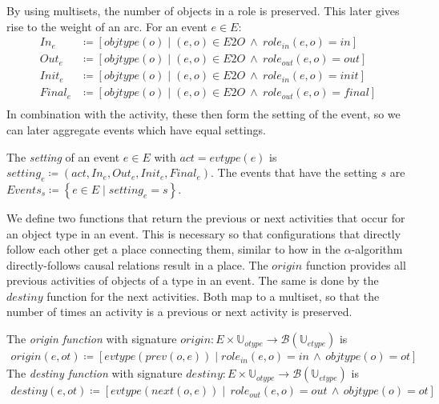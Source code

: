 By using multisets, the number of objects in a role is preserved.
This later gives rise to the weight of an arc.
For an event $e \in E$:
\begin{align*}
    \mathit{In}_e &\coloneqq \left[ objtype(o) \mid (e, o) \in E2O\ \land\ role_{in}(e, o) = in \right] \\
    \mathit{Out}_e &\coloneqq \left[ objtype(o) \mid (e, o) \in E2O\ \land\ role_{out}(e, o) = out \right] \\
    \mathit{Init}_e &\coloneqq \left[ objtype(o) \mid (e, o) \in E2O\ \land\ role_{in}(e, o) = init \right] \\
    \mathit{Final}_e &\coloneqq \left[ objtype(o) \mid (e, o) \in E2O\ \land\ role_{out}(e, o) = final \right] \\
\end{align*}
In combination with the activity, these then form the setting of the event, so we can later aggregate events which have equal settings.
\begin{definition}[Setting]
    The \emph{setting} of an event $e \in E$ with $act = evtype(e)$ is $setting_e \coloneqq (act, \mathit{In}_e, \mathit{Out}_e, \mathit{Init}_e, \mathit{Final}_e)$.
    The events that have the setting $s$ are $\mathit{Events}_s \coloneqq \left\{ e \in E \mid setting_e = s \right\}$.
\end{definition}




We define two functions that return the previous or next activities that occur for an object type in an event.
This is necessary so that configurations that directly follow each other get a place connecting them, similar to how in the $\alpha$-algorithm directly-follows causal relations result in a place\autocite{van2004}.
The $origin$ function provides all previous activities of objects of a type in an event.
The same is done by the $destiny$ function for the next activities.
Both map to a multiset, so that the number of times an activity is a previous or next activity is preserved.
\begin{definition}
    The \emph{origin function} with signature $origin: E \times \mathbb{U}_{otype} \rightarrow \mathcal{B}(\mathbb{U}_{etype})$ is 
    \begin{align*}
        origin(e, ot) \coloneqq [ evtype(prev(o, e)) \mid role_{in}(e, o) = in\,  \land\, objtype(o) = ot ]
    \end{align*}
    The \emph{destiny function} with signature $destiny: E \times \mathbb{U}_{otype} \rightarrow \mathcal{B}(\mathbb{U}_{etype})$ is 
    \begin{align*}
        destiny(e, ot) \coloneqq [ evtype(next(o, e)) \mid\, role_{out}(e, o) = out\, \land\, objtype(o) = ot ]
    \end{align*}
\end{definition}


